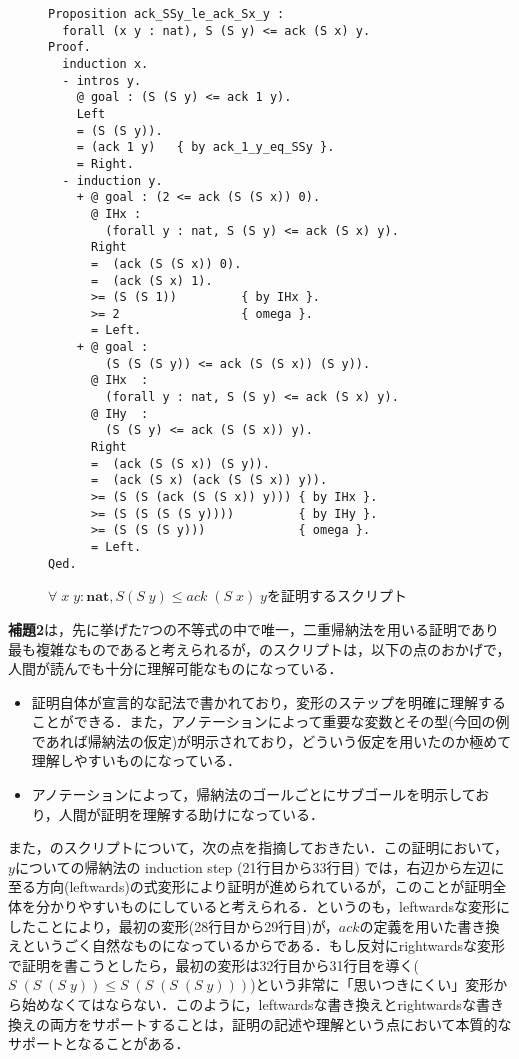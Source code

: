 \documentclass[submit]{ipsj}
\begin{document}
\begin{figure}[t]
\begin{mdframed}
\begin{verbatim}
Proposition ack_SSy_le_ack_Sx_y :
  forall (x y : nat), S (S y) <= ack (S x) y.
Proof.
  induction x.
  - intros y.
    @ goal : (S (S y) <= ack 1 y).
    Left
    = (S (S y)).
    = (ack 1 y)   { by ack_1_y_eq_SSy }.
    = Right.
  - induction y.
    + @ goal : (2 <= ack (S (S x)) 0).
      @ IHx :
        (forall y : nat, S (S y) <= ack (S x) y).
      Right
      =  (ack (S (S x)) 0).
      =  (ack (S x) 1).
      >= (S (S 1))         { by IHx }.
      >= 2                 { omega }.
      = Left.
    + @ goal :
        (S (S (S y)) <= ack (S (S x)) (S y)).
      @ IHx  :
        (forall y : nat, S (S y) <= ack (S x) y).
      @ IHy  :
        (S (S y) <= ack (S (S x)) y).
      Right
      =  (ack (S (S x)) (S y)).
      =  (ack (S x) (ack (S (S x)) y)).
      >= (S (S (ack (S (S x)) y))) { by IHx }.
      >= (S (S (S (S y))))         { by IHy }.
      >= (S (S (S y)))             { omega }.
      = Left.
Qed.
\end{verbatim}
\end{mdframed}
\caption{$\forall \; x \; y : \mathbf{nat} \mathrel{,} S(S\;y) \leq \mathit{ack}\;(S\;x)\;y$を証明するスクリプト}\label{fig:lem_script2}
\end{figure}

{\gtfamily\bfseries 補題2}は，先に挙げた7つの不等式の中で唯一，二重帰納法を用いる証明であり最も複雑なものであると考えられるが，のスクリプトは，以下の点のおかげで，人間が読んでも十分に理解可能なものになっている．
\begin{itemize}
\item 証明自体が宣言的な記法で書かれており，変形のステップを明確に理解することができる．また，アノテーションによって重要な変数とその型(今回の例であれば帰納法の仮定)が明示されており，どういう仮定を用いたのか極めて理解しやすいものになっている．
\item アノテーションによって，帰納法のゴールごとにサブゴールを明示しており，人間が証明を理解する助けになっている．
\end{itemize}

また，のスクリプトについて，次の点を指摘しておきたい．この証明において，$y$についての帰納法の induction step (21行目から33行目) では，右辺から左辺に至る方向(leftwards)の式変形により証明が進められているが，このことが証明全体を分かりやすいものにしていると考えられる．というのも，leftwardsな変形にしたことにより，最初の変形(28行目から29行目)が，$\mathit{ack}$の定義を用いた書き換えというごく自然なものになっているからである．もし反対にrightwardsな変形で証明を書こうとしたら，最初の変形は32行目から31行目を導く($S\;(S\;(S\;y)) \leq S\;(S\;(S\;(S\;y)))$)という非常に「思いつきにくい」変形から始めなくてはならない．このように，leftwardsな書き換えとrightwardsな書き換えの両方をサポートすることは，証明の記述や理解という点において本質的なサポートとなることがある．
\end{document}
